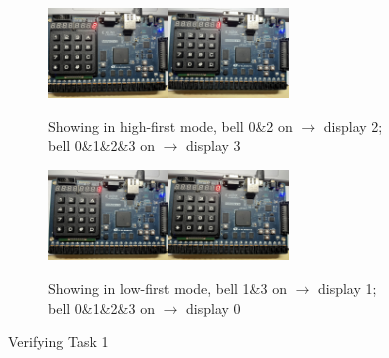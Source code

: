 \documentclass[onecolumn, oneside, ctexart]{SUSTechHomework}
\begin{document}
\begin{figure}[!h]
\begin{subfigure}[b]{\textwidth}
	\end{subfigure}
	\begin{subfigure}[b]{\textwidth}
		\centerline{\includegraphics[width=0.35\textwidth]{./t1/hif2.jpg}\qquad\includegraphics[width=0.35\textwidth]{./t1/hif3.jpg}}
		\caption{Showing in high-first mode, bell 0\&2 on $\to$ display 2; bell 0\&1\&2\&3 on $\to$ display 3}
	\end{subfigure}
	\begin{subfigure}[b]{\textwidth}
		\centerline{\includegraphics[width=0.35\textwidth]{./t1/lof13.jpg}\qquad\includegraphics[width=0.35\textwidth]{./t1/lof3.jpg}}
		\caption{Showing in low-first mode, bell 1\&3 on $\to$ display 1; bell 0\&1\&2\&3 on $\to$ display 0}
	\end{subfigure}
	\caption{Verifying Task 1}
	\label{fig:visual_smap}
\end{figure}
\pagebreak
\end{document}
